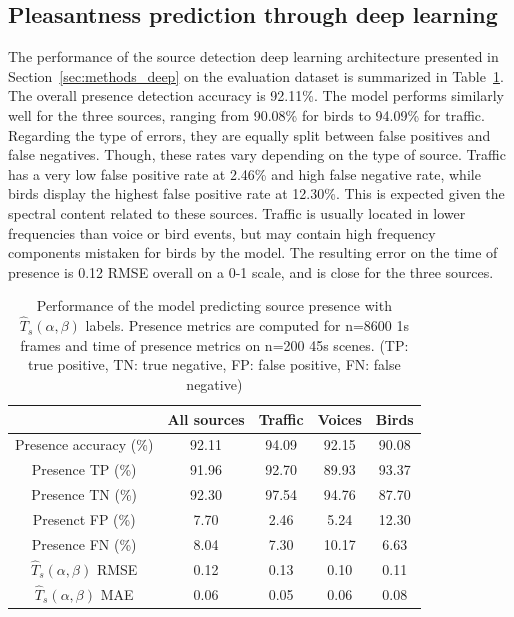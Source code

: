 \documentclass[11pt,a4paper]{article}
\begin{document}
\subsection{Pleasantness prediction through deep learning}
\label{sec:results_deep}

The performance of the source detection deep learning architecture presented in Section~\ref{sec:methods_deep} on the evaluation dataset is summarized in Table~\ref{tab:perf_cmp}. The overall presence detection accuracy is 92.11\%. The model performs similarly well for the three sources, ranging from 90.08\% for birds to 94.09\% for traffic. Regarding the type of errors, they are equally split between false positives and false negatives. Though, these rates vary depending on the type of source. Traffic has a very low false positive rate at 2.46\% and high false negative rate, while birds display the highest false positive rate at 12.30\%. This is expected given the spectral content related to these sources. Traffic is usually located in lower frequencies than voice or bird events, but may contain high frequency components mistaken for birds by the model. The resulting error on the time of presence is 0.12 RMSE overall on a 0-1 scale, and is close for the three sources.\\


\begin{table}[t]
\centering
\caption{Performance of the model predicting source presence with $\hat T_s(\alpha, \beta)$ labels. Presence metrics are computed for n=8600 1s frames and time of presence metrics on n=200 45s scenes. (TP: true positive, TN: true negative, FP: false positive, FN: false negative)}
\label{tab:perf_cmp}
\begin{tabular}{ c | c | c c c }
\hline
	 & All sources & Traffic & Voices & Birds \\ \hline
	Presence accuracy (\%) &  92.11 & 94.09 & 92.15 & 90.08 \\
	Presence TP (\%) & 91.96 & 92.70 & 89.93 & 93.37 \\
	Presence TN (\%) & 92.30 & 97.54 & 94.76 & 87.70 \\
	Presenct FP (\%) & 7.70 & 2.46 & 5.24 & 12.30 \\
	Presence FN (\%) & 8.04 & 7.30 & 10.17 & 6.63 \\ \hline
	$\hat T_s(\alpha, \beta)$ RMSE & 0.12 & 0.13 & 0.10 & 0.11 \\
	$\hat T_s(\alpha, \beta)$ MAE & 0.06 & 0.05 & 0.06 & 0.08 \\ \hline
\end{tabular}
\end{table}
\end{document}
